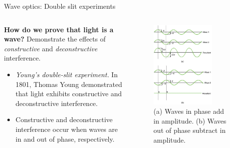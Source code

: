 \documentclass{beamer}
\begin{document}
\begin{frame}{Wave optics: Double slit experiments}
\begin{columns}[T]
\begin{column}{0.5\textwidth}
\small
\textbf{How do we prove that light is a wave?} Demonstrate the effects of \textit{constructive} and \textit{deconstructive} interference.
\begin{itemize}
\item \textit{Young's double-slit experiment.} In 1801, Thomas Young demonstrated that light exhibits constructive and deconstructive interference.
\item Constructive and deconstructive interference occur when waves are in and out of phase, respectively.
\end{itemize}
\end{column}
\begin{column}{0.5\textwidth}
\begin{figure}
\centering
\includegraphics[width=0.75\textwidth]{figures/slit2.png}
\caption{\label{fig:slit2} \footnotesize (a) Waves in phase add in amplitude. (b) Waves out of phase subtract in amplitude.}
\end{figure}
\end{column}
\end{columns}
\end{frame}
\end{document}
